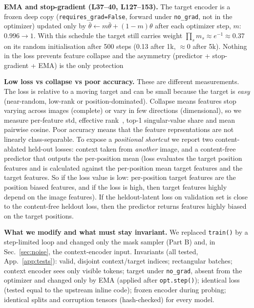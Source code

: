 \documentclass[10pt]{article}
\begin{document}
\textbf{EMA and stop-gradient (L37--40, L127--153).} The target encoder is a frozen deep copy (\texttt{requires\_grad=False},
forward under \texttt{no\_grad}, not in the optimizer) updated only by $\bar\theta\leftarrow m\bar\theta+(1-m)\theta$ after each
optimizer step, $m$: $0.996\to1$. With this schedule the target still carries weight $\prod_s m_s\approx e^{-1}\approx 0.37$
on its random initialisation after 500 steps (0.13 after 1k, $\approx$0 after 5k). Nothing in the loss prevents feature collapse and the
asymmetry (predictor + stop-gradient + EMA) is the only protection

\textbf{Low loss vs collapse vs poor accuracy.} These are different measurements. The loss is relative to a moving target and
can be small because the target is \emph{easy} (near-random, low-rank or position-dominated). Collapse means features stop
varying across images (complete) or vary in few directions (dimensional), so we measure per-feature std, effective
rank~\cite{roy2007effrank}, top-1 singular-value share and mean pairwise cosine. Poor accuracy means that the feature reprsentations are not
linearly class-separable. To expose a \emph{positional shortcut} we report two content-ablated held-out losses: context taken
from \emph{another} image, and a content-free predictor that outputs the per-position mean (loss evaluates the target position features and is calculated against the per-position mean target features and the target features. So if the loss value is low: per-position target features are the position biased features, and if the loss is high, then target features highly depend on the image features).
If the heldout-latent loss on validation set is close to the content-free heldout loss, then the predictor returns features highly biased on the target positions.

\textbf{What we modify and what must stay invariant.} We replaced \texttt{train()} by a step-limited loop and changed only
the mask sampler (Part B) and, in Sec.~\ref{sec:noise}, the context-encoder input. Invariants (all tested,
App.~\ref{app:tests}): valid, disjoint context/target indices; rectangular batches; context encoder sees only visible tokens;
target under \texttt{no\_grad}, absent from the optimizer and changed only by EMA (applied after \texttt{opt.step()});
identical loss (tested equal to the upstream inline code); frozen encoder during probing; identical splits and corruption
tensors (hash-checked) for every model.
\end{document}
